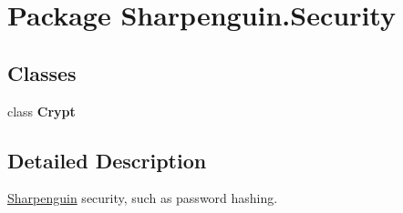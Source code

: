\hypertarget{namespaceSharpenguin_1_1Security}{\section{Package Sharpenguin.\-Security}
\label{namespaceSharpenguin_1_1Security}
}
\subsection*{Classes}
\begin{DoxyCompactItemize}
\item 
class {\bfseries Crypt}
\end{DoxyCompactItemize}


\subsection{Detailed Description}
\hyperlink{namespaceSharpenguin}{Sharpenguin} security, such as password hashing. 